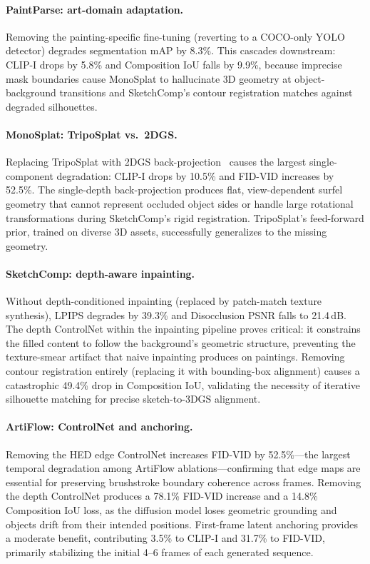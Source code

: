 \paragraph{PaintParse: art-domain adaptation.}
Removing the painting-specific fine-tuning (reverting to a COCO-only YOLO
detector) degrades segmentation mAP by 8.3\%. This cascades downstream: CLIP-I
drops by 5.8\% and Composition IoU falls by 9.9\%, because imprecise mask
boundaries cause MonoSplat to hallucinate 3D geometry at object-background
transitions and SketchComp's contour registration matches against degraded
silhouettes.

\paragraph{MonoSplat: TripoSplat vs.\ 2DGS.}
Replacing TripoSplat with 2DGS back-projection~\cite{huang20242dgs} causes the
largest single-component degradation: CLIP-I drops by 10.5\% and FID-VID
increases by 52.5\%. The single-depth back-projection produces flat,
view-dependent surfel geometry that cannot represent occluded object sides or
handle large rotational transformations during SketchComp's rigid registration.
TripoSplat's feed-forward prior, trained on diverse 3D assets, successfully
generalizes to the missing geometry.

\paragraph{SketchComp: depth-aware inpainting.}
Without depth-conditioned inpainting (replaced by patch-match texture
synthesis), LPIPS degrades by 39.3\% and Disocclusion PSNR falls to 21.4\,dB.
The depth ControlNet within the inpainting pipeline proves critical: it
constrains the filled content to follow the background's geometric structure,
preventing the texture-smear artifact that naive inpainting produces on
paintings. Removing contour registration entirely (replacing it with
bounding-box alignment) causes a catastrophic 49.4\% drop in Composition IoU,
validating the necessity of iterative silhouette matching for precise
sketch-to-3DGS alignment.

\paragraph{ArtiFlow: ControlNet and anchoring.}
Removing the HED edge ControlNet increases FID-VID by 52.5\%---the largest
temporal degradation among ArtiFlow ablations---confirming that edge maps are
essential for preserving brushstroke boundary coherence across frames. Removing
the depth ControlNet produces a 78.1\% FID-VID increase and a 14.8\% Composition
IoU loss, as the diffusion model loses geometric grounding and objects drift
from their intended positions. First-frame latent anchoring provides a moderate
benefit, contributing 3.5\% to CLIP-I and 31.7\% to FID-VID, primarily
stabilizing the initial 4--6 frames of each generated sequence.

